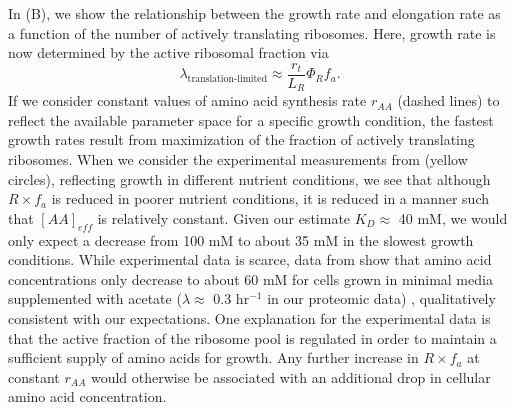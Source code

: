In (B), we show the relationship between the growth
rate and elongation rate as a function of the number of actively translating
ribosomes. Here, growth rate is now determined by the active ribosomal fraction via
\begin{equation}
\lambda_\text{translation-limited} \approx \frac{r_t}{L_R}  \Phi_R f_a.
\label{eq:translation_limit_growth_rate_2}
\end{equation}
If we consider constant values of amino acid synthesis rate $r_{AA}$ (dashed
lines) to reflect the available parameter space for a specific growth condition,
the fastest growth rates result from  maximization of the fraction of actively translating
ribosomes. When we consider the experimental measurements from \cite{dai2018}
(yellow circles), reflecting growth in different nutrient conditions, we see
that although $R \times f_a$ is reduced in poorer nutrient conditions, it is
reduced in a manner such that $[AA]_{eff}$ is relatively constant. Given our estimate
$K_D \approx$ 40 mM,  we would only expect a decrease from 100 mM to about 35 mM
in the slowest growth conditions. While experimental data is scarce, data from
\cite{bennett2009} show that amino acid
concentrations only decrease to about 60 mM for cells grown in minimal media
supplemented with acetate ($\lambda \approx$  0.3 hr$^{-1}$ in our proteomic data)
\citep{bennett2009}, qualitatively consistent with our expectations. One
explanation for the experimental data is that the active fraction of the
ribosome pool is regulated in order to maintain a sufficient supply of amino acids for
growth. Any further increase in $R \times f_a$ at constant $r_{AA}$ would
otherwise be associated with an additional drop in cellular amino acid
concentration.

